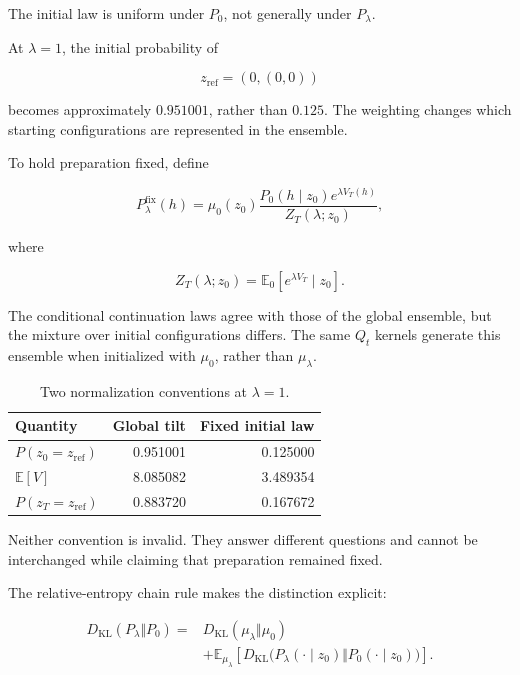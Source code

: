 \documentclass[11pt]{article}
\theoremstyle{remark}
\newcommand{\KL}{D_{\mathrm{KL}}}
\newcommand{\E}{\mathbb{E}}
\begin{document}
The initial law is uniform under \(P_0\), not generally under \(P_\lambda\).

At \(\lambda=1\), the initial probability of

\begin{equation}
z_{\mathrm{ref}}=(0,(0,0))
\end{equation}

becomes approximately \(0.951001\), rather than \(0.125\). The weighting changes which starting configurations are represented in the ensemble.

To hold preparation fixed, define

\begin{equation}
P_\lambda^{\mathrm{fix}}(h)
=
\mu_0(z_0)
\frac{
P_0(h\mid z_0)e^{\lambda V_T(h)}
}{
Z_T(\lambda;z_0)
},
\end{equation}

where

\begin{equation}
Z_T(\lambda;z_0)
=
\E_0[e^{\lambda V_T}\mid z_0].
\end{equation}

The conditional continuation laws agree with those of the global ensemble, but the mixture over initial configurations differs. The same \(Q_t\) kernels generate this ensemble when initialized with \(\mu_0\), rather than \(\mu_\lambda\).

\begin{table}[htbp]
\centering
\caption{Two normalization conventions at \(\lambda=1\).}
\label{tab:init}
\begin{tabular}{@{}lrr@{}}
\toprule
Quantity & Global tilt & Fixed initial law \\
\midrule
\(P(z_0=z_{\mathrm{ref}})\) & 0.951001 & 0.125000 \\
\(\E[V]\) & 8.085082 & 3.489354 \\
\(P(z_T=z_{\mathrm{ref}})\) & 0.883720 & 0.167672 \\
\bottomrule
\end{tabular}
\end{table}

Neither convention is invalid. They answer different questions and cannot be interchanged while claiming that preparation remained fixed.

The relative-entropy chain rule makes the distinction explicit:

\begin{align}
\KL(P_\lambda\Vert P_0)
={}&\KL(\mu_\lambda\Vert\mu_0)\\
&+\E_{\mu_\lambda}
\left[
\KL
\bigl(
P_\lambda(\cdot\mid z_0)
\Vert
P_0(\cdot\mid z_0)
\bigr)
\right].
\end{align}
\end{document}
